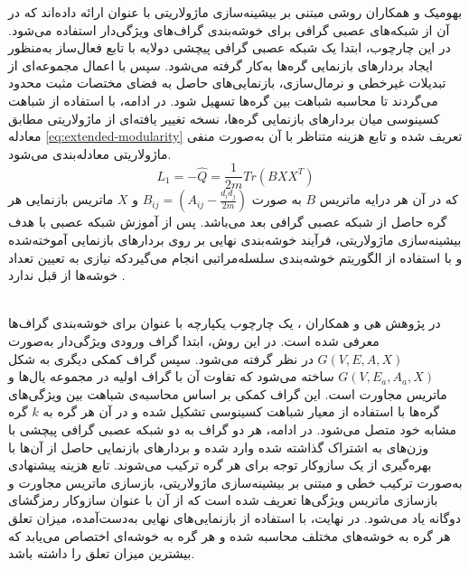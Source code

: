 بهومیک و همکاران \cite{bhowmick2024dgcluster} روشی مبتنی بر بیشینه‌سازی ماژولاریتی با عنوان  ارائه داده‌اند که در آن از شبکه‌های عصبی گرافی برای خوشه‌بندی گراف‌های ویژگی‌‌دار استفاده می‌شود. در این چارچوب، ابتدا یک شبکه عصبی گرافی پیچشی دو‌لایه با تابع فعال‌ساز  به‌منظور ایجاد بردارهای بازنمایی گره‌ها به‌کار گرفته می‌شود. سپس با اعمال مجموعه‌ای از تبدیلات غیرخطی و نرمال‌سازی، بازنمایی‌های حاصل به فضای مختصات مثبت محدود می‌گردند تا محاسبه شباهت بین گره‌ها تسهیل شود. در ادامه، با استفاده از شباهت کسینوسی میان بردارهای بازنمایی گره‌ها، نسخه‌ تغییر یافته‌ای از ماژولاریتی مطابق معادله \ref{eq:extended-modularity} تعریف شده و تابع هزینه متناظر با آن به‌صورت منفی ماژولاریتی معادله‌بندی می‌شود.
\begin{equation}
	L_1 = - \hat{Q} = \frac{1}{2m}Tr(BXX^{T})
	\label{eq:extended-modularity}
\end{equation}
که در آن هر درایه ماتریس $B$ به صورت $B_{ij} = (A_{ij} - \frac{d_i d_j}{2m})$ و $X$ ماتریس بازنمایی هر گره حاصل از شبکه عصبی گرافی بعد می‌باشد.
پس از آموزش شبکه عصبی با هدف بیشینه‌سازی ماژولاریتی، فرآیند خوشه‌بندی نهایی بر روی بردارهای بازنمایی آموخته‌شده و با استفاده از الگوریتم خوشه‌بندی سلسله‌مراتبی  انجام می‌گیردکه نیازی به تعیین تعداد خوشه‌ها از قبل ندارد \cite{zhang1996birch}.

\\
در پژوهش هی و همکاران \cite{he2024detecting}، یک چارچوب یکپارچه با عنوان  برای خوشه‌بندی گراف‌ها معرفی شده است. در این روش، ابتدا گراف ورودی ویژگی‌دار به‌صورت $G(V,E,A,X)$ در نظر گرفته می‌شود. سپس گراف کمکی دیگری به‌ شکل $G(V,E_a,A_a,X)$ ساخته می‌شود که تفاوت آن با گراف اولیه در مجموعه یال‌ها و ماتریس مجاورت است. این گراف کمکی بر اساس محاسبه‌ی شباهت بین ویژگی‌های گره‌ها با استفاده از معیار شباهت کسینوسی تشکیل شده و در آن هر گره به $k$ گره مشابه خود متصل می‌شود. در ادامه، هر دو گراف به دو شبکه عصبی گرافی پیچشی با وزن‌های به‌ اشتراک‌ گذاشته‌ شده وارد شده و بردارهای بازنمایی حاصل از آن‌ها با بهره‌گیری از یک سازوکار توجه برای هر گره ترکیب می‌شوند. تابع هزینه پیشنهادی به‌صورت ترکیب خطی و مبتنی بر بیشینه‌سازی ماژولاریتی، بازسازی ماتریس مجاورت و بازسازی ماتریس ویژگی‌ها تعریف شده است که از آن با عنوان سازوکار رمزگشای دوگانه یاد می‌شود. در نهایت، با استفاده از بازنمایی‌های نهایی به‌دست‌آمده، میزان تعلق هر گره به خوشه‌های مختلف محاسبه شده و هر گره به خوشه‌ای اختصاص می‌یابد که بیشترین میزان تعلق را داشته باشد.



